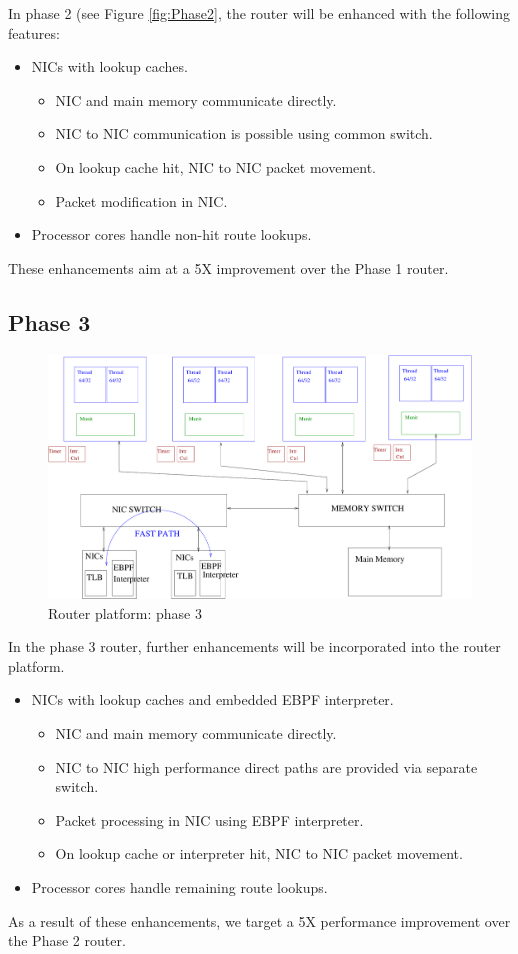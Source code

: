 \documentclass{article}
\begin{document}
In phase 2 (see Figure \ref{fig:Phase2}, 
the router will be enhanced with the following features:
\begin{itemize}
\item NICs with lookup caches.
\begin{itemize}
\item NIC and main memory communicate directly.
\item NIC to NIC communication is possible using
common switch.
\item On lookup cache hit, NIC to NIC packet
movement.
\item Packet modification in NIC.
\end{itemize}
\item Processor cores handle non-hit route lookups.
\end{itemize}
These enhancements aim at a 5X improvement over the Phase 1 router.

\subsection{Phase 3}
\begin{figure}
  \centering
  \includegraphics[width=12cm]{figs/Router_III.pdf}
  \caption{Router platform: phase 3}
   \label{fig:Phase3}
\end{figure}

In the phase 3 router, further enhancements will be
incorporated into the router platform.
\begin{itemize}
\item NICs with lookup caches and embedded EBPF interpreter.
\begin{itemize}
\item NIC and main memory communicate directly.
\item NIC to NIC high performance direct paths are provided via
separate switch.
\item Packet processing in NIC using EBPF interpreter.
\item On lookup cache or interpreter hit, NIC to NIC packet
movement.
\end{itemize}
\item Processor cores handle remaining route lookups.
\end{itemize}
As a result of these enhancements, we target a 5X performance
improvement over the Phase 2 router.
\end{document}
